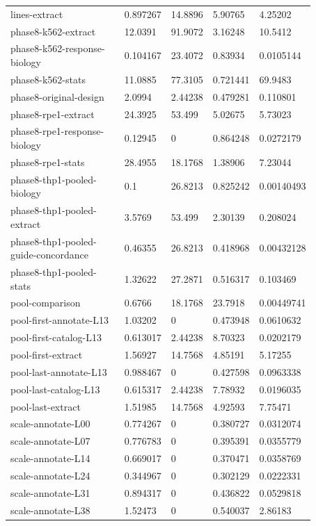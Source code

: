\begin{longtable}{@{}L{0.39\linewidth}L{0.11\linewidth}L{0.12\linewidth}L{0.12\linewidth}L{0.13\linewidth}@{}}
lines-extract & 0.897267 & 14.8896 & 5.90765 & 4.25202 \\
phase8-k562-extract & 12.0391 & 91.9072 & 3.16248 & 10.5412 \\
phase8-k562-response-biology & 0.104167 & 23.4072 & 0.83934 & 0.0105144 \\
phase8-k562-stats & 11.0885 & 77.3105 & 0.721441 & 69.9483 \\
phase8-original-design & 2.0994 & 2.44238 & 0.479281 & 0.110801 \\
phase8-rpe1-extract & 24.3925 & 53.499 & 5.02675 & 5.73023 \\
phase8-rpe1-response-biology & 0.12945 & 0 & 0.864248 & 0.0272179 \\
phase8-rpe1-stats & 28.4955 & 18.1768 & 1.38906 & 7.23044 \\
phase8-thp1-pooled-biology & 0.1 & 26.8213 & 0.825242 & 0.00140493 \\
phase8-thp1-pooled-extract & 3.5769 & 53.499 & 2.30139 & 0.208024 \\
phase8-thp1-pooled-guide-concordance & 0.46355 & 26.8213 & 0.418968 & 0.00432128 \\
phase8-thp1-pooled-stats & 1.32622 & 27.2871 & 0.516317 & 0.103469 \\
pool-comparison & 0.6766 & 18.1768 & 23.7918 & 0.00449741 \\
pool-first-annotate-L13 & 1.03202 & 0 & 0.473948 & 0.0610632 \\
pool-first-catalog-L13 & 0.613017 & 2.44238 & 8.70323 & 0.0202179 \\
pool-first-extract & 1.56927 & 14.7568 & 4.85191 & 5.17255 \\
pool-last-annotate-L13 & 0.988467 & 0 & 0.427598 & 0.0963338 \\
pool-last-catalog-L13 & 0.615317 & 2.44238 & 7.78932 & 0.0196035 \\
pool-last-extract & 1.51985 & 14.7568 & 4.92593 & 7.75471 \\
scale-annotate-L00 & 0.774267 & 0 & 0.380727 & 0.0312074 \\
scale-annotate-L07 & 0.776783 & 0 & 0.395391 & 0.0355779 \\
scale-annotate-L14 & 0.669017 & 0 & 0.370471 & 0.0358769 \\
scale-annotate-L24 & 0.344967 & 0 & 0.302129 & 0.0222331 \\
scale-annotate-L31 & 0.894317 & 0 & 0.436822 & 0.0529818 \\
scale-annotate-L38 & 1.52473 & 0 & 0.540037 & 2.86183 \\

\end{longtable}
